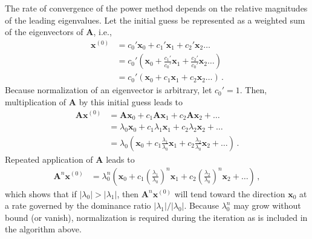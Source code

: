 The rate of convergence of the power method depends on the relative magnitudes of the leading eigenvalues.  
Let the initial guess be represented as a weighted sum of the eigenvectors of $\mathbf{A}$, i.e.,
\begin{equation}
\begin{split}
  \mathbf{x}^{(0)} 
     &=  c_0' \mathbf{x}_0 + c_1' \mathbf{x}_1 + c_2'  \mathbf{x}_2 \ldots \,  \\
     &=  c_0' \left (\mathbf{x}_0 + \frac{c_1'}{c_0'} \mathbf{x}_1 + \frac{c_2'}{c_0'} \mathbf{x}_2 \ldots  \right ) \\
     &=  c_0' \left (\mathbf{x}_0 + c_1 \mathbf{x}_1 + c_2 \mathbf{x}_2 \ldots  \right )\, .         
\end{split}
\end{equation}
Because normalization of an eigenvector is arbitrary, let $c_0' = 1$.
Then, multiplication of $\mathbf{A}$ by this initial guess leads to
\begin{equation}
\begin{split}
  \mathbf{A} \mathbf{x}^{(0)} 
   &=  \mathbf{A} \mathbf{x}_0  +  c_1 \mathbf{A} \mathbf{x}_1 + c_2 \mathbf{A} \mathbf{x}_2 + \ldots \\
   &= \lambda_0 \mathbf{x}_0 + c_1 \lambda_1 \mathbf{x}_1 + c_2 \lambda_2 \mathbf{x}_2 + \ldots \\ 
   &= \lambda_0 \left ( \mathbf{x}_0 + c_1 \frac{\lambda_1}{\lambda_0} \mathbf{x}_1 + c_2 \frac{\lambda_2}{\lambda_0} \mathbf{x}_2 + \ldots \right ) \, .
\end{split}
\end{equation}
Repeated application of $\mathbf{A}$ leads to
\begin{equation}
\begin{split}
  \mathbf{A}^n \mathbf{x}^{(0)} 
   &= \lambda^n_0 \left ( \mathbf{x}_0 + c_1 \left( \frac{\lambda_1}{\lambda_0} \right)^n \mathbf{x}_1 + c_2 \left ( \frac{\lambda_2}{\lambda_0} \right )^n \mathbf{x}_2 + \ldots \right ) \, ,
\end{split}
\end{equation}
which shows that if $|\lambda_0| > |\lambda_1|$, then $\mathbf{A}^n \mathbf{x}^{(0)}$ will tend toward the direction $\mathbf{x}_0$ at a rate governed by the dominance ratio $|\lambda_1|/|\lambda_0|$. 
Because $\lambda^n_0$ may grow without bound (or vanish), normalization is required during the iteration as is included in the algorithm above.



